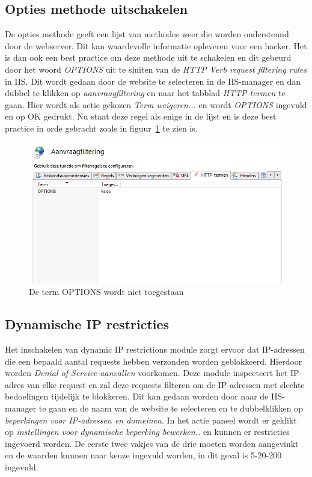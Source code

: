 \documentclass[pdftex,a4paper,12pt]{report}
\begin{document}
\subsection{Opties methode uitschakelen}
De opties methode geeft een lijst van methodes weer die worden ondersteund door de webserver. Dit kan waardevolle informatie opleveren voor een hacker. Het is dan ook een best practice om deze methode uit te schakelen en dit gebeurd door het woord \textit{OPTIONS} uit te sluiten van de \textit{HTTP Verb request filtering rules} in IIS. Dit wordt gedaan door de website te selecteren in de IIS-manager en dan dubbel te klikken op \textit{aanvraagfiltering} en naar het tabblad \textit{HTTP-termen} te gaan. Hier wordt als actie gekozen \textit{Term weigeren...} en wordt \textit{OPTIONS} ingevuld en op OK gedrukt. Nu staat deze regel als enige in de lijst en is deze best practice in orde gebracht zoals in figuur~\ref{img:IISOptions} te zien is. \citep{Darmanin2014}

\begin{figure}[H]
\begin{center}
\includegraphics[scale=0.60]{img/IIS_Options}
\end{center}
\caption{De term OPTIONS wordt niet toegestaan}
\label{img:IISOptions}
\end{figure}

\subsection{Dynamische IP restricties}
Het inschakelen van dynamic IP restrictions module zorgt ervoor dat IP-adressen die een bepaald aantal requests hebben verzonden worden geblokkeerd. Hierdoor worden \textit{Denial of Service-aanvallen} voorkomen. Deze module inspecteert het IP-adres van elke request en zal deze requests filteren om de IP-adressen met slechte bedoelingen tijdelijk te blokkeren. Dit kan gedaan worden door naar de IIS-manager te gaan en de naam van de website te selecteren en te dubbelklikken op \textit{beperkingen voor IP-adressen en domeinen}. In het actie paneel wordt er geklikt op \textit{instellingen voor dynamische beperking bewerken.. }en kunnen er restricties ingevoerd worden. De eerste twee vakjes van de drie moeten worden aangevinkt en de waarden kunnen naar keuze ingevuld worden, in dit geval is 5-20-200 ingevuld. \citep{Darmanin2014}
\end{document}
